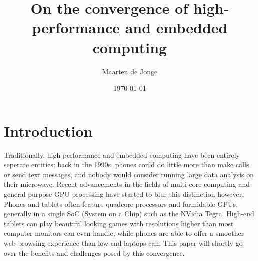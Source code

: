 \documentclass[a4paper]{article}
\author{Maarten de Jonge}
\date{\today}
\title{On the convergence of high-performance and embedded computing}
\begin{document}
\maketitle

\section{Introduction}
Traditionally, high-performance and embedded computing have been entirely
seperate entities; back in the 1990s, phones could do little more than make
calls or send text messages, and nobody would consider running large data
analysis on their microwave. Recent advancements in the fields of multi-core
computing and general purpose GPU processing have started to blur this
distinction however. Phones and tablets often feature quadcore processors and
formidable GPUs, generally in a single SoC (System on a Chip) such as the NVidia
Tegra. High-end tablets can play beautiful looking games with resolutions
higher than most computer monitors can even handle, while phones are able to
offer a smoother web browsing experience than low-end laptops can. This paper
will shortly go over the benefits and challenges posed by this convergence.
\end{document}
